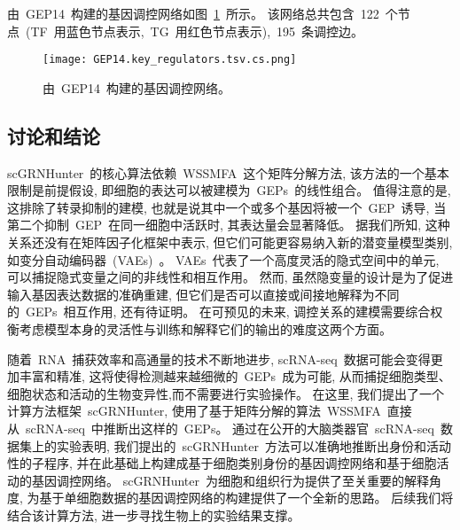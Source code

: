 由~GEP14~构建的基因调控网络如图~\ref{fig:gep-grn-gep14}~所示。
该网络总共包含~122~个节点~(TF~用蓝色节点表示,~TG~用红色节点表示),~195~条调控边。
\begin{figure}[!htbp]
    \centering
    \texttt{[image: GEP14.key\_regulators.tsv.cs.png]}
    \caption{
    由~GEP14~构建的基因调控网络。
    }
    \label{fig:gep-grn-gep14}
\end{figure}

\subsection{讨论和结论}
scGRNHunter~的核心算法依赖~WSSMFA~这个矩阵分解方法, 该方法的一个基本限制是前提假设, 
即细胞的表达可以被建模为~GEPs~的线性组合。
值得注意的是, 这排除了转录抑制的建模, 也就是说其中一个或多个基因将被一个~GEP~诱导,
当第二个抑制~GEP~在同一细胞中活跃时, 其表达量会显著降低。
据我们所知, 这种关系还没有在矩阵因子化框架中表示, 但它们可能更容易纳入新的潜变量模型类别,
如变分自动编码器~(VAEs)~\cite{ding2018interpretable,gronbech2018scvae}。
VAEs~代表了一个高度灵活的隐式空间中的单元, 可以捕捉隐式变量之间的非线性和相互作用。
然而, 虽然隐变量的设计是为了促进输入基因表达数据的准确重建, 
但它们是否可以直接或间接地解释为不同的~GEPs~相互作用, 还有待证明。
在可预见的未来, 调控关系的建模需要综合权衡考虑模型本身的灵活性与训练和解释它们的输出的难度这两个方面。

随着~RNA~捕获效率和高通量的技术不断地进步, scRNA-seq~数据可能会变得更加丰富和精准,
这将使得检测越来越细微的~GEPs~成为可能, 从而捕捉细胞类型、细胞状态和活动的生物变异性,而不需要进行实验操作。
在这里, 我们提出了一个计算方法框架~scGRNHunter,
使用了基于矩阵分解的算法~WSSMFA~直接从~scRNA-seq~中推断出这样的~GEPs。 
通过在公开的大脑类器官~scRNA-seq~数据集上的实验表明,
我们提出的~scGRNHunter~方法可以准确地推断出身份和活动性的子程序, 
并在此基础上构建成基于细胞类别身份的基因调控网络和基于细胞活动的基因调控网络。
scGRNHunter~为细胞和组织行为提供了至关重要的解释角度,
为基于单细胞数据的基因调控网络的构建提供了一个全新的思路。
后续我们将结合该计算方法, 进一步寻找生物上的实验结果支撑。